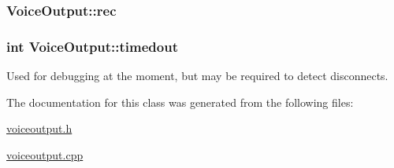 \hypertarget{class_voice_output_a74bd87b7370dfddcc1976460e009a432}{
\subsubsection[{rec}]{ {\bf \-Voice\-Output\-::rec}}}
\label{class_voice_output_a74bd87b7370dfddcc1976460e009a432}
\hypertarget{class_voice_output_a2a8d5759fdf1535a3be202832496dfea}{
\subsubsection[{timedout}]{\setlength{\rightskip}{0pt plus 5cm}int {\bf \-Voice\-Output\-::timedout}}}
\label{class_voice_output_a2a8d5759fdf1535a3be202832496dfea}


\-Used for debugging at the moment, but may be required to detect disconnects. 



\-The documentation for this class was generated from the following files\-:\begin{DoxyCompactItemize}
\item 
\hyperlink{voiceoutput_8h}{voiceoutput.\-h}\item 
\hyperlink{voiceoutput_8cpp}{voiceoutput.\-cpp}\end{DoxyCompactItemize}
